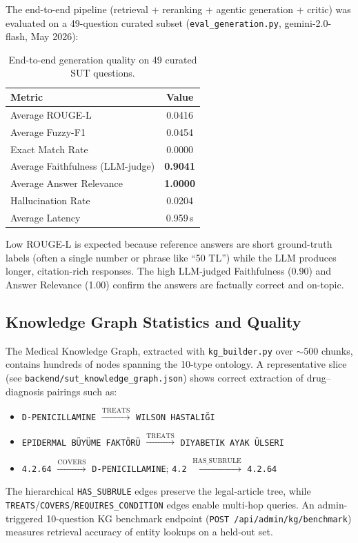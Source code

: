 \documentclass[11pt, a4paper]{article}
\begin{document}
The end-to-end pipeline (retrieval + reranking + agentic generation + critic) was evaluated on a 49-question curated subset (\texttt{eval\_generation.py}, gemini-2.0-flash, May 2026):

\begin{table}[H]
    \centering
    \small
    \begin{tabular}{lc}
        \toprule
        \textbf{Metric} & \textbf{Value} \\
        \midrule
        Average ROUGE-L            & 0.0416 \\
        Average Fuzzy-F1           & 0.0454 \\
        Exact Match Rate           & 0.0000 \\
        Average Faithfulness (LLM-judge) & \textbf{0.9041} \\
        Average Answer Relevance   & \textbf{1.0000} \\
        Hallucination Rate         & 0.0204 \\
        Average Latency            & 0.959\,s \\
        \bottomrule
    \end{tabular}
    \caption{End-to-end generation quality on 49 curated SUT questions.}
\end{table}

Low ROUGE-L is expected because reference answers are short ground-truth labels (often a single number or phrase like ``50 TL'') while the LLM produces longer, citation-rich responses. The high LLM-judged Faithfulness (0.90) and Answer Relevance (1.00) confirm the answers are factually correct and on-topic.

\subsection{Knowledge Graph Statistics and Quality}

The Medical Knowledge Graph, extracted with \texttt{kg\_builder.py} over $\sim$500 chunks, contains hundreds of nodes spanning the 10-type ontology. A representative slice (see \texttt{backend/sut\_knowledge\_graph.json}) shows correct extraction of drug--diagnosis pairings such as:
\begin{itemize}[leftmargin=*]
    \item \texttt{D-PENICILLAMINE} $\xrightarrow{\text{TREATS}}$ \texttt{WILSON HASTALIĞI}
    \item \texttt{EPIDERMAL BÜYÜME FAKTÖRÜ} $\xrightarrow{\text{TREATS}}$ \texttt{DIYABETIK AYAK ÜLSERI}
    \item \texttt{4.2.64} $\xrightarrow{\text{COVERS}}$ \texttt{D-PENICILLAMINE};\; \texttt{4.2} $\xrightarrow{\text{HAS\_SUBRULE}}$ \texttt{4.2.64}
\end{itemize}
The hierarchical \texttt{HAS\_SUBRULE} edges preserve the legal-article tree, while \texttt{TREATS}/\texttt{COVERS}/\texttt{REQUIRES\_CONDITION} edges enable multi-hop queries. An admin-triggered 10-question KG benchmark endpoint (\texttt{POST /api/admin/kg/benchmark}) measures retrieval accuracy of entity lookups on a held-out set.
\end{document}
